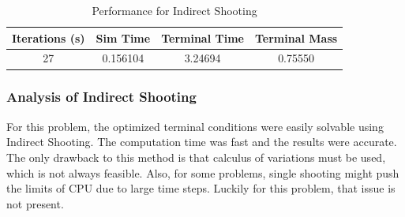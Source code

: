 \documentclass[]{article}
\begin{document}
\begin{table}
	\centering
	\begin{tabular}{||c c c c||} 
		\hline
		Iterations (s) & Sim Time & Terminal Time & Terminal Mass\\ [0.5ex] 
		\hline\hline
		27            & 0.156104     &   3.24694       & 0.75550\\ [1ex]
		\hline
	\end{tabular}
\caption{Performance for Indirect Shooting}
\label{table:1}
\end{table}

\subsubsection{Analysis of Indirect Shooting}
For this problem, the optimized terminal conditions were easily solvable using Indirect Shooting. The computation time was fast and the results were accurate. The only drawback to this method is that calculus of variations must be used, which is not always feasible. Also, for some problems, single shooting might push the limits of CPU due to large time steps. Luckily for this problem, that issue is not present.
\FloatBarrier
\end{document}

